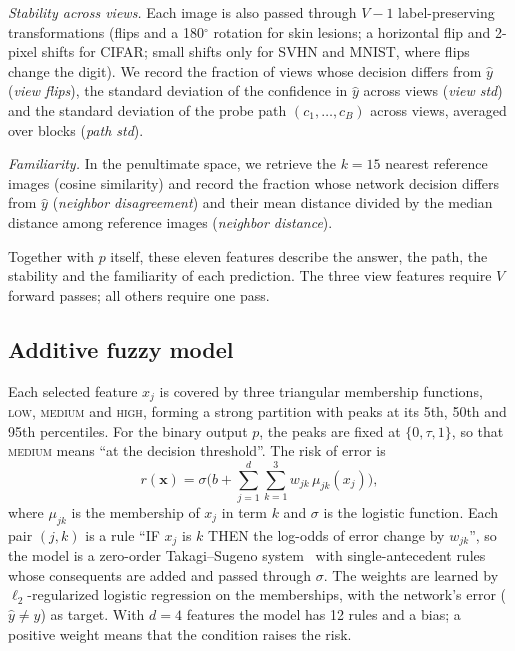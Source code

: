 \documentclass[conference,a4paper]{IEEEtran}
\newcommand{\term}[1]{\textsc{#1}}
\begin{document}
\textit{Stability across views.}
Each image is also passed through $V-1$ label-preserving transformations (flips and a 180$^\circ$ rotation for skin lesions; a horizontal flip and
2-pixel shifts for CIFAR; small shifts only for SVHN and MNIST, where flips change the digit). We record the fraction of views whose decision differs from $\hat y$ (\textit{view flips}),
the standard deviation of the confidence in $\hat y$ across views (\textit{view std}) and the standard deviation of the probe path
$(c_1,\dots,c_B)$ across views, averaged over blocks (\textit{path std}).

\textit{Familiarity.}
In the penultimate space, we retrieve the $k=15$ nearest reference images (cosine similarity) and record the fraction whose network
decision differs from $\hat y$ (\textit{neighbor disagreement}) and their mean distance divided by the median distance among reference
images (\textit{neighbor distance}).

Together with $p$ itself, these eleven features describe the answer, the path, the stability and the familiarity of each prediction.
The three view features require $V$ forward passes; all others require one pass.

\subsection{Additive fuzzy model}
Each selected feature $x_j$ is covered by three triangular membership functions, \term{low}, \term{medium} and \term{high}, forming a strong
partition with peaks at its 5th, 50th and 95th percentiles. For the binary output $p$, the peaks are fixed at $\{0, \tau, 1\}$, so that
\term{medium} means ``at the decision threshold''. The risk of error is
\begin{equation}
  r(\mathbf{x}) = \sigma\Big(b + \sum_{j=1}^{d}\sum_{k=1}^{3} w_{jk}\,\mu_{jk}(x_j)\Big),
  \label{eq:aditivo}
\end{equation}
where $\mu_{jk}$ is the membership of $x_j$ in term $k$ and $\sigma$ is the logistic function. Each pair $(j,k)$ is a rule
``IF $x_j$ is $k$ THEN the log-odds of error change by $w_{jk}$'', so the model is a zero-order Takagi--Sugeno system~\cite{takagi1985}
with single-antecedent rules whose consequents are added and passed through $\sigma$. The weights are learned by $\ell_2$-regularized
logistic regression on the memberships, with the network's error ($\hat y \ne y$) as target. With $d=4$ features the model has 12 rules
and a bias; a positive weight means that the condition raises the risk.
\end{document}
